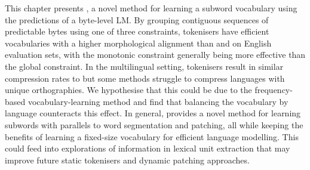 This chapter presents \tokname, a novel method for learning a subword vocabulary using the predictions of a byte-level LM. By grouping contiguous sequences of predictable bytes using one of three constraints, \tokname tokenisers have efficient vocabularies with a higher morphological alignment than \bpe and \bpewp on English evaluation sets, with the monotonic constraint generally being more effective than the global constraint. In the multilingual setting, \tokname tokenisers result in similar compression rates to \bpe but some methods struggle to compress languages with unique orthographies. We hypothesise that this could be due to the frequency-based vocabulary-learning method and find that balancing the vocabulary by language counteracts this effect. In general, \tokname provides a novel method for learning subwords with parallels to word segmentation and patching, all while keeping the benefits of learning a fixed-size vocabulary for efficient language modelling. This could feed into explorations of information in lexical unit extraction that may improve future static tokenisers and dynamic patching approaches.





